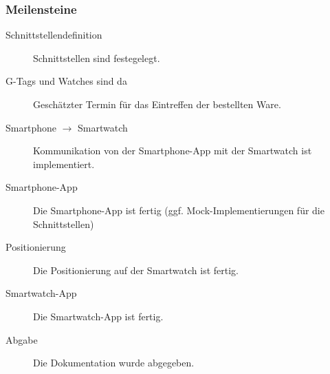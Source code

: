 \subsubsection{Meilensteine}
\begin{description}
	\item[Schnittstellendefinition] Schnittstellen sind festegelegt.
	\item[G-Tags und Watches sind da] Geschätzter Termin für das Eintreffen der bestellten Ware.
	\item[Smartphone $\rightarrow$ Smartwatch] Kommunikation von der Smartphone-App mit der Smartwatch ist implementiert.
	\item[Smartphone-App] Die Smartphone-App ist fertig (ggf. Mock-Implementierungen für die Schnittstellen)
	\item[Positionierung] Die Positionierung auf der Smartwatch ist fertig.
	\item[Smartwatch-App] Die Smartwatch-App ist fertig.
	\item[Abgabe] Die Dokumentation wurde abgegeben.
\end{description}